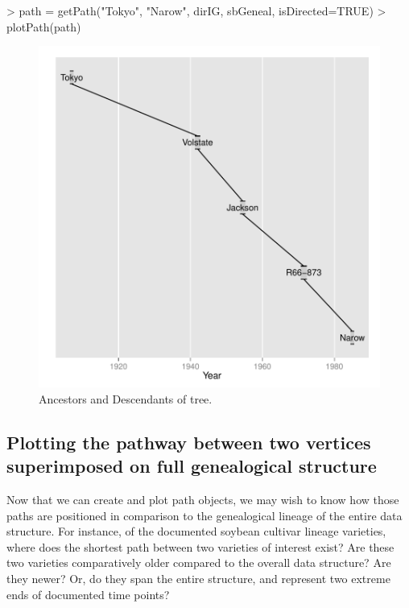 \documentclass{article}
\numberwithin{equation}{section} %
\begin{document}
\begin{Schunk}
\begin{Sinput}
> path = getPath("Tokyo", "Narow", dirIG, sbGeneal, isDirected=TRUE)
> plotPath(path)
\end{Sinput}
\end{Schunk}

\begin{figure} 
  \begin{center} 
\includegraphics{ggenealogy-plotPath3}
\end{center} 
\caption{Ancestors and Descendants of tree.}
\label{fig:plotPath3}
\end{figure}

\subsection{Plotting the pathway between two vertices superimposed on full genealogical structure}

Now that we can create and plot path objects, we may wish to know how those paths are positioned in comparison to the genealogical lineage of the entire data structure. For instance, of the documented soybean cultivar lineage varieties, where does the shortest path between two varieties of interest exist? Are these two varieties comparatively older compared to the overall data structure? Are they newer? Or, do they span the entire structure, and represent two extreme ends of documented time points?
\end{document}

